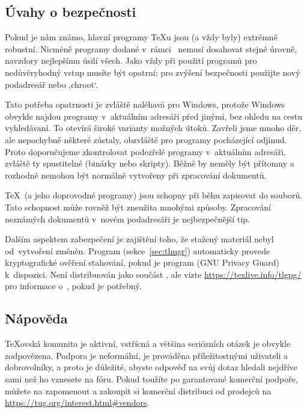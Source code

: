 \documentclass[\classoptions,slovak,english,czech]{\classname}
\newcommand{\singleuv}[1]{,#1`}
\begin{document}
\subsection{Úvahy o bezpečnosti}
\label{sec:security}

Pokud je nám známo, hlavní programy \TeX{u} jsou (a vždy byly)
extrémně robustní. Nicméně programy dodané v~rámci \TL\ nemusí dosahovat
stejné úrovně, navzdory nejlepšímu úsilí všech. Jako vždy při použití programů
pro nedůvěryhodný vstup musíte být opatrní; pro zvýšení bezpečnosti použijte
nový podadresář nebo \singleuv{chroot}.

Tato potřeba opatrnosti je zvláště naléhavá pro Windows, protože 
Windows obvykle najdou programy v~aktuálním adresáři před jinými,
bez ohledu na cestu vyhledávaní. To otevírá široké varianty možných
útoků. Zavřeli jsme mnoho děr, ale nepochybně některé zůstaly,
obzvláště pro programy pocházející odjinud. Proto doporučujeme 
zkontrolovat podezřelé programy v~aktuálním adresáři, zvláště ty spustitelné 
(binárky nebo skripty). Běžně by neměly být přítomny a rozhodně
nemohou být normálně vytvořeny při zpracování dokumentů.

\TeX\ (a jeho doprovodné programy) jsou schopny při běhu
zapisovat do souborů. Tato schopnost může rovněž být zneužita 
mnohými způsoby. Zpracování neznámých dokumentů v~novém podadresáři 
je nejbezpečnější tip.

Dalším aspektem zabezpečení je zajištění toho, že stažený materiál nebyl
od~vytvoření změněn. Program 
(sekce~\ref{sec:tlmgr}) automaticky provede kryptografické
ověření stahování, pokud je program  (GNU Privacy Guard)
k~dispozici. Není distribuován jako součást \TL, ale vizte
\url{https://texlive.info/tlgpg/} pro informace o~, pokud
je potřebný.

\subsection{Nápověda}
\label{sec:help}

\TeX{}ovská komunita je aktivní, vstřícná a většina
seriózních otázek je obvykle zodpovězena. Podpora je
neformální, je prováděna příležitostnými uživateli a dobrovolníky,
a proto je důležité, abyste odpověď na svůj dotaz hledali nejdříve sami
než ho vznesete na fóru. Pokud toužíte po garantované komerční podpoře,
můžete na \TL{} zapomenout a zakoupit si komerční distribuci od
prodejců na \url{https://tug.org/interest.html#vendors}.
\end{document}
